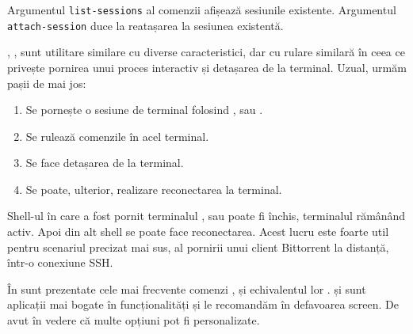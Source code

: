
Argumentul \texttt{list-sessions} al comenzii  afișează sesiunile existente. Argumentul \texttt{attach-session} duce la reatașarea la sesiunea existentă.

, ,  sunt utilitare similare cu diverse caracteristici, dar cu
rulare similară în ceea ce privește pornirea unui proces interactiv și detașarea
de la terminal. Uzual, urmăm pașii de mai jos:

\begin{enumerate}
  \item Se pornește o sesiune de terminal folosind ,  sau .
	\item Se rulează comenzile în acel terminal.
	\item Se face detașarea de la terminal.
	\item Se poate, ulterior, realizare reconectarea la terminal.
\end{enumerate}

Shell-ul în care a fost pornit terminalul ,  sau  poate fi
închis, terminalul rămânând activ. Apoi din alt shell se poate face
reconectarea. Acest lucru este foarte util pentru scenariul precizat mai sus, al
pornirii unui client Bittorrent la distanță, într-o conexiune SSH.

În  sunt prezentate cele mai frecvente comenzi ,  și echivalentul
lor .  și  sunt aplicații mai bogate în funcționalități și le
recomandăm în defavoarea screen. De avut în vedere că multe opțiuni pot fi personalizate.

